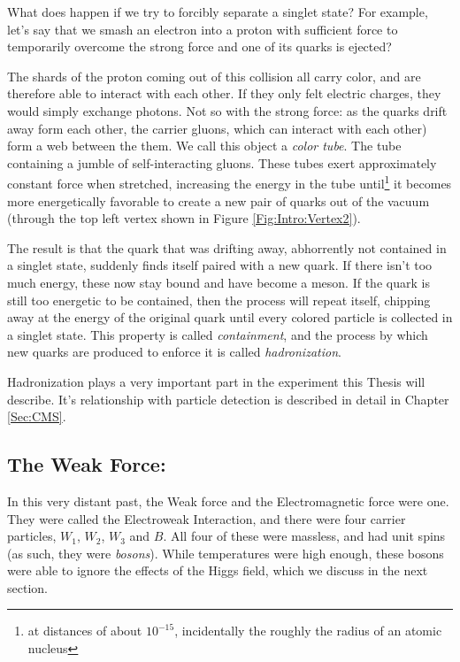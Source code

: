 What does happen if we try to forcibly separate a singlet state? For example, let's say that we smash an electron into a proton with sufficient force to temporarily overcome the strong force and one of its quarks is ejected?

The shards of the proton coming out of this collision all carry color, and are therefore able to interact with each other. If they only felt electric charges, they would simply exchange photons. Not so with the strong force: as the quarks drift away form each other, the carrier gluons, which can interact with each other) form a web between the them. We call this object a \textit{color tube}. The tube containing a jumble of self-interacting gluons. These tubes exert approximately constant force when stretched, increasing the energy in the tube until\footnote{at distances of about $10^{-15}$, incidentally the roughly the radius of an atomic nucleus} it becomes more energetically favorable to create a new pair of quarks out of the vacuum (through the top left vertex shown in Figure \ref{Fig:Intro:Vertex2}).

The result is that the quark that was drifting away, abhorrently not contained in a singlet state, suddenly finds itself paired with a new quark. If there isn't too much energy, these now stay bound and have become a meson. If the quark is still too energetic to be contained, then the process will repeat itself, chipping away at the energy of the original quark until every colored particle is collected in a singlet state. This property is called \textit{containment}, and the process by which new quarks are produced to enforce it is called \textit{hadronization}. 

Hadronization plays a very important part in the experiment this Thesis will describe. It's relationship with particle detection is described in detail in Chapter \ref{Sec:CMS}.

\subsection{The Weak Force:}
In this very distant past, the Weak force and the Electromagnetic force were one. They were called the Electroweak Interaction, and there were four carrier particles, $W_1$, $W_2$, $W_3$ and $B$. All four of these were massless, and had unit spins (as such, they were \textit{bosons}). While temperatures were high enough, these bosons were able to ignore the effects of the Higgs field, which we discuss in the next section.

